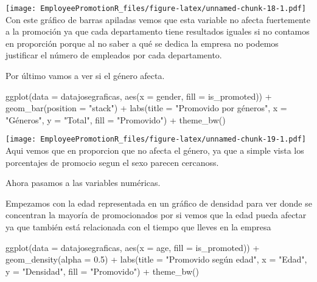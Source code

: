 \documentclass[
]{article}
\newenvironment{Shaded}{\begin{snugshade}}{\end{snugshade}}
\newcommand{\AttributeTok}[1]{\textcolor[rgb]{0.77,0.63,0.00}{#1}}
\newcommand{\FloatTok}[1]{\textcolor[rgb]{0.00,0.00,0.81}{#1}}
\newcommand{\FunctionTok}[1]{\textcolor[rgb]{0.00,0.00,0.00}{#1}}
\newcommand{\NormalTok}[1]{#1}
\newcommand{\SpecialCharTok}[1]{\textcolor[rgb]{0.00,0.00,0.00}{#1}}
\newcommand{\StringTok}[1]{\textcolor[rgb]{0.31,0.60,0.02}{#1}}
\begin{document}
\texttt{[image: EmployeePromotionR\_files/figure-latex/unnamed-chunk-18-1.pdf]}
Con este gráfico de barras apiladas vemos que esta variable no afecta
fuertemente a la promoción ya que cada departamento tiene resultados
iguales si no contamos en proporción porque al no saber a qué se dedica
la empresa no podemos justificar el número de empleados por cada
departamento.

Por último vamos a ver si el género afecta.

\begin{Shaded}
\begin{Highlighting}[]
\FunctionTok{ggplot}\NormalTok{(}\AttributeTok{data =}\NormalTok{ datajosegraficas, }\FunctionTok{aes}\NormalTok{(}\AttributeTok{x =}\NormalTok{ gender, }\AttributeTok{fill =}\NormalTok{ is\_promoted)) }\SpecialCharTok{+}
  \FunctionTok{geom\_bar}\NormalTok{(}\AttributeTok{position =} \StringTok{"stack"}\NormalTok{) }\SpecialCharTok{+}
  \FunctionTok{labs}\NormalTok{(}\AttributeTok{title =} \StringTok{"Promovido por géneros"}\NormalTok{, }
       \AttributeTok{x =} \StringTok{"Géneros"}\NormalTok{, }
       \AttributeTok{y =} \StringTok{"Total"}\NormalTok{,}
       \AttributeTok{fill =} \StringTok{"Promovido"}\NormalTok{) }\SpecialCharTok{+}
  \FunctionTok{theme\_bw}\NormalTok{()}
\end{Highlighting}
\end{Shaded}

\texttt{[image: EmployeePromotionR\_files/figure-latex/unnamed-chunk-19-1.pdf]}
Aqui vemos que en proporcion que no afecta el género, ya que a simple
vista los porcentajes de promocio segun el sexo parecen cercanoss.

Ahora pasamos a las variables numéricas.

Empezamos con la edad representada en un gráfico de densidad para ver
donde se concentran la mayoría de promocionados por si vemos que la edad
pueda afectar ya que también está relacionada con el tiempo que lleves
en la empresa

\begin{Shaded}
\begin{Highlighting}[]
\FunctionTok{ggplot}\NormalTok{(}\AttributeTok{data =}\NormalTok{ datajosegraficas, }\FunctionTok{aes}\NormalTok{(}\AttributeTok{x =}\NormalTok{ age, }\AttributeTok{fill =}\NormalTok{ is\_promoted)) }\SpecialCharTok{+}
  \FunctionTok{geom\_density}\NormalTok{(}\AttributeTok{alpha =} \FloatTok{0.5}\NormalTok{) }\SpecialCharTok{+}
  \FunctionTok{labs}\NormalTok{(}\AttributeTok{title =} \StringTok{"Promovido según edad"}\NormalTok{, }
       \AttributeTok{x =} \StringTok{"Edad"}\NormalTok{, }
       \AttributeTok{y =} \StringTok{"Densidad"}\NormalTok{,}
       \AttributeTok{fill =} \StringTok{"Promovido"}\NormalTok{) }\SpecialCharTok{+}
  \FunctionTok{theme\_bw}\NormalTok{()}
\end{Highlighting}
\end{Shaded}
\end{document}

